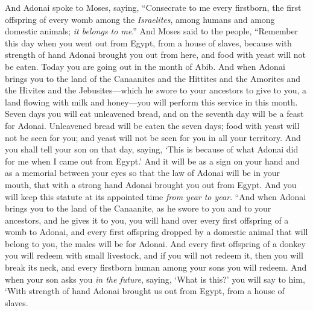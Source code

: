 \begin{biblechapter} %
 And Adonai spoke to Moses, saying,
\verse “Consecrate to me every firstborn, the first offspring of every womb among the \textit{Israelites}, among humans and among domestic animals; \textit{it belongs to me}.”
\verse And Moses said to the people, “Remember this day when you went out from Egypt, from a house of slaves, because with strength of hand Adonai brought you out from here, and food with yeast will not be eaten.
\verse Today you are going out in the month of Abib.
\verse And when Adonai brings you to the land of the Canaanites and the Hittites and the Amorites and the Hivites and the Jebusites—which he swore to your ancestors to give to you, a land flowing with milk and honey—you will perform this service in this month.
\verse Seven days you will eat unleavened bread, and on the seventh day will be a feast for Adonai.
\verse Unleavened bread will be eaten the seven days; food with yeast will not be seen for you; and yeast will not be seen for you in all your territory.
\verse And you shall tell your son on that day, saying, ‘This is because of what Adonai did for me when I came out from Egypt.’
\verse And it will be as a sign on your hand and as a memorial between your eyes so that the law of Adonai will be in your mouth, that with a strong hand Adonai brought you out from Egypt.
\verse And you will keep this statute at its appointed time \textit{from year to year}.
\verse “And when Adonai brings you to the land of the Canaanite, as he swore to you and to your ancestors, and he gives it to you,
\verse you will hand over every first offspring of a womb to Adonai, and every first offspring dropped by a domestic animal that will belong to you, the males will be for Adonai.
\verse And every first offspring of a donkey you will redeem with small livestock, and if you will not redeem it, then you will break its neck, and every firstborn human among your sons you will redeem.
\verse And when your son asks you \textit{in the future}, saying, ‘What is this?’ you will say to him, ‘With strength of hand Adonai brought us out from Egypt, from a house of slaves.

\end{biblechapter}
